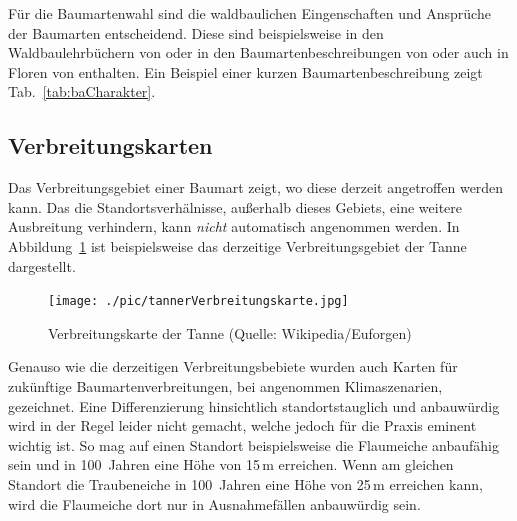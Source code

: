 \documentclass[twocolumn]{scrartcl}
\begin{document}
Für die Baumartenwahl sind die waldbaulichen Eingenschaften und
Ansprüche der Baumarten entscheidend. Diese sind beispielsweise in den
Waldbaulehrbüchern von
\citet{mayer1992Waldbau,burschel2003Waldbau,Dengler2020Waldbau,tschermak1950Waldbau,rittershofer2006Waldbau,rubner1960Waldbau,koestler1950Waldbau,bauer1962WaldbauAlsWissenschaft}
oder in den Baumartenbeschreibungen von
\citet{eth2002MitteleuropaeischeWaldbaumarten,leibundgut1984Waldbaeume,ec2016baumartenatlas,hieke1989Dendrologie,mayr1906FremdlaendischeWaldUndParkbaeumeFuerEuropa,stimm2014EnyklopedieDerHolzgewaechse,schuett1993LexikonDerForstbotanik,fva2021Artensteckbrief}
oder auch in Floren von
\citet{fischer2008Exkursionsflora,hegi1906IllustrierteFloraBd1,oberdorfer2001Exkursionsflora,rothmaler2021Exkursionsflora,schmeil2019Exkursionsflora,fitschen2017Gehoelzflora}
enthalten. Ein Beispiel einer kurzen Baumartenbeschreibung zeigt
Tab.~\ref{tab:baCharakter}.

\subsection{Verbreitungskarten}
\label{sec:verbreitungskarten}

Das Verbreitungsgebiet einer Baumart zeigt, wo diese derzeit
angetroffen werden kann. Das die Standortsverhälnisse, außerhalb
dieses Gebiets, eine weitere Ausbreitung verhindern, kann \emph{nicht}
automatisch angenommen werden. In
Abbildung~\ref{fig:tannerVerbreitungskarte} ist beispielsweise das
derzeitige Verbreitungsgebiet der Tanne dargestellt.

\begin{figure}[htbp]
  \centering
  \texttt{[image: ./pic/tannerVerbreitungskarte.jpg]}
  \caption{Verbreitungskarte der Tanne (Quelle: Wikipedia/Euforgen)}
  \label{fig:tannerVerbreitungskarte}
\end{figure}

Genauso wie die derzeitigen Verbreitungsbebiete wurden auch Karten für
zukünftige Baumartenverbreitungen, bei angenommen Klimaszenarien,
gezeichnet. Eine Differenzierung hinsichtlich standortstauglich und
anbauwürdig wird in der Regel leider nicht gemacht, welche jedoch für
die Praxis eminent wichtig ist. So mag auf einen Standort
beispielsweise die Flaumeiche anbaufähig sein und in 100~Jahren eine
Höhe von 15\,m erreichen. Wenn am gleichen Standort die Traubeneiche
in 100~Jahren eine Höhe von 25\,m erreichen kann, wird die Flaumeiche
dort nur in Ausnahmefällen anbauwürdig sein.
\end{document}
